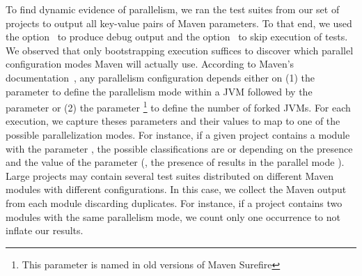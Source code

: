 To find dynamic evidence of parallelism, we ran the test suites from
our set of \numMedLong{} projects to output all key-value pairs of
Maven parameters.  To that end, we used the option~ to
produce debug output and the option~ to skip
execution of tests.  We observed that only bootstrapping execution
suffices to discover which parallel configuration modes Maven will
actually use.  According to Maven's
documentation~\cite{maven-surefire-plugin}, any parallelism
configuration depends either on (1) the parameter  to
define the parallelism mode within a JVM followed by the parameter
 or (2) the parameter
\footnote{This parameter is named 
  in old versions of Maven Surefire} to define the number of forked
JVMs. For each execution, we capture theses parameters and their
values to map to one of the possible parallelization modes.  For
instance, if a given project contains a module with the parameter
, the possible classifications are
\ForkSeq{} or \ForkParMeth{} depending on the presence and the value
of the parameter  (\ie, the presence of
 results in the parallel mode
\ForkParMeth{}).  Large projects may contain several test suites
distributed on different Maven modules with different
configurations. In this case, we collect the Maven output from each
module discarding duplicates. For instance, if a project contains two
modules with the same parallelism mode, we count only one occurrence
to not inflate our results.


